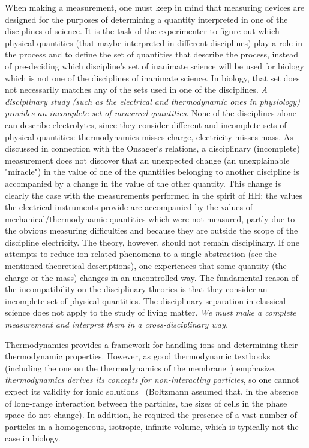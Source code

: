 When making a measurement, one must keep in mind that 
measuring devices are designed for the purposes of
determining a quantity interpreted in one of the disciplines of science.
It is the task of the experimenter to figure out
which physical quantities (that maybe interpreted in different disciplines)
play a role in the process and to define the set of quantities 
that describe the process, instead of pre-deciding which discipline's set of inanimate science
will be used for biology which is not one of the disciplines of inanimate science.
 In biology, that set does not necessarily 
matches any of the sets used in one of the disciplines.
\textit{A disciplinary study (such as the electrical and thermodynamic ones in physiology) provides an incomplete set of measured quantities}. None of the disciplines alone can describe electrolytes, since they consider different and incomplete sets of physical quantities: thermodynamics misses charge, electricity misses mass.
As discussed in connection with the Onsager's relations, a disciplinary (incomplete) measurement does not discover that an unexpected change (an unexplainable "miracle") in the value of one of the quantities belonging to another discipline is accompanied by a change in the
value of the other quantity. This change is clearly the case with the measurements performed in the spirit of \gls{HH}: the values the
electrical instruments provide are accompanied by the values
of mechanical/thermodynamic quantities which were not measured, partly due to the obvious 
measuring difficulties and because they are outside the scope of the discipline electricity.  The theory, however, should not remain disciplinary.
If one attempts to reduce ion-related phenomena to a single abstraction (see the mentioned theoretical descriptions),
one experiences that some quantity (the charge or the mass)
changes in an uncontrolled way.
The fundamental reason of the incompatibility on the disciplinary theories 
is that they consider an incomplete set of physical quantities.
The disciplinary separation in classical science does not apply to the study of living matter.
\textit{We must make a complete measurement and interpret them in a cross-disciplinary way.}


Thermodynamics provides a framework for handling ions and determining their thermodynamic properties. However,
as good thermodynamic textbooks (including the one on the thermodynamics of the membrane~\cite{ThermalBiophysics:2007}) emphasize, \textit{thermodynamics
derives its concepts for non-interacting particles}, so one cannot expect 
its validity for ionic solutions~\cite{VeghNon-ordinaryLaws:2025}
(Boltzmann assumed that, in the absence of long-range interaction between the particles, the sizes of cells in the phase space do not change).
In addition, he required  the presence of a vast number of particles
in a homogeneous, isotropic, infinite volume,
which is typically not the case in biology.


